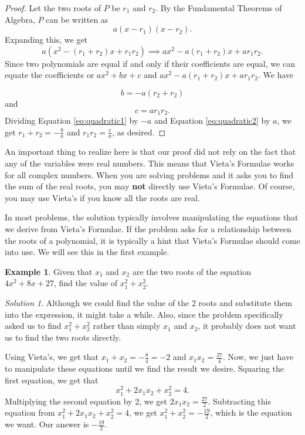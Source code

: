 \documentclass[l1pt]{article}
\theoremstyle{plain}
\theoremstyle{definition}
\newtheorem{example}[thm]{Example}
\theoremstyle{remark}
\newtheorem*{solution}{Solution}
\begin{document}
\begin{proof}
Let the two roots of $P$ be $r_1$ and $r_2$. By the Fundamental Theorems of Algebra, $P$ can be written as \[a(x-r_1)(x-r_2).\] Expanding this, we get \[a(x^2-(r_1+r_2)x+r_1 r_2) \implies ax^2-a(r_1+r_2)x+ar_1 r_2.\] Since two polynomials are equal if and only if their coefficients are equal, we can equate the coefficients or $ax^2+bx+c$ and $ax^2-a(r_1+r_2)x+ar_1 r_2$. We have

\begin{equation}  \label{eq:quadratic1} b=-a(r_2+r_2) \end{equation} and
\begin{equation}  \label{eq:quadratic2}  c=ar_1 r_2.  \end{equation}
Dividing Equation \ref{eq:quadratic1} by $-a$ and Equation \ref{eq:quadratic2} by $a$, we get $r_1+r_2=-\frac{b}{a}$ and $r_1 r_2=\frac{c}{a}$, as desired.

\end{proof}

An important thing to realize here is that our proof did not rely on the fact that any of the variables were real numbers. This means that Vieta's Formulae works for all complex numbers. When you are solving problems and it asks you to find the sum of the real roots, you may \textbf{not} directly use Vieta's Formulae. Of course, you may use Vieta's if you know all the roots are real.

\bigskip

In most problems, the solution typically involves manipulating the equations that we derive from Vieta's Formulae. If the problem asks for a relationship between the roots of a polynomial, it is typically a hint that Vieta's Formulae should come into use. We will see this in the first example.

\begin{example}
Given that $x_1$ and $x_2$ are the two roots of the equation $4x^2+8x+27$, find the value of $x_1 ^{2}+x_2 ^{2}.$
\end{example}

\begin{solution}
Although we could find the value of the 2 roots and substitute them into the expression, it might take a while. Also, since the problem specifically asked us to find $x_1 ^{2}+x_2 ^{2}$ rather than simply $x_1$ and $x_2$, it probably does not want us to find the two roots directly.

Using Vieta's, we get that $x_1+x_2=-\frac{8}{4}=-2$ and $x_1 x_2=\frac{27}{4}$. Now, we just have to manipulate these equations until we find the result we desire. Squaring the first equation, we get that \[x_1 ^{2}+2x_1x_2+x_2^{2}=4.\] Multiplying the second equation by 2, we get $2x_1x_2=\frac{27}{2}$. Subtracting this equation from $x_1 ^{2}+2x_1x_2+x_2^{2}=4$, we get $x_1^{2}+x_2^{2}=-\frac{19}{2}$, which is the equation we want. Our answer is $-\frac{19}{2}$.
\end{solution}
\end{document}
